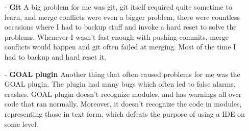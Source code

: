 \begin{itemize}
\item[-] \textbf{Git}
A big problem for me was git, git itself required quite sometime to learn, and merge conflicts were even a bigger problem, there were countless occasions where I had to backup stuff and invoke a hard reset to solve the problems. Whenever I wasn't fast enough with pushing commits, merge conflicts would happen and git often failed at merging. Most of the time I had to backup and hard reset it.
\item[-] \textbf{GOAL plugin}
Another thing that often caused problems for me was the GOAL plugin. The plugin had many bugs which often led to false alarms, crashes. GOAL plugin doesn't recognize modules, and has warnings all over code that ran normally. Moreover, it doesn't recognize the code in modules, representing those in text form, which defeats the purpose of using a IDE on some level.
\end{itemize}
